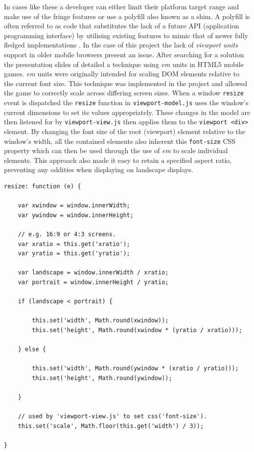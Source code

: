 \documentclass[final]{cmpreport}
\begin{document}
In cases like these a developer can either limit their platform target range and make use of the fringe features or use a polyfill also known as a shim. A polyfill is often referred to as code that substitutes the lack of a future API (application programming interface) by utilising existing features to mimic that of newer fully fledged implementations \cite{Lawson}. In the case of this project the lack of \textit{viewport units} support in older mobile browsers present an issue. After searching for a solution the presentation slides of \cite{Kadrmas} detailed a technique using \textit{em} units in HTML5 mobile games. \textit{em} units were originally intended for scaling DOM elements relative to the current font size. This technique was implemented in the project and allowed the game to correctly scale across differing screen sizes. When a window \texttt{resize} event is dispatched the \texttt{resize} function in \texttt{viewport-model.js} uses the window's current dimensions to set its values appropriately. These changes in the model are then listened for by \texttt{viewport-view.js} then applies them to the \texttt{viewport <div>} element. By changing the font size of the root (viewport) element relative to the window's width, all the contained elements also inherent this \texttt{font-size} CSS property which can then be used through the use of \textit{em} to scale individual elements. This approach also made it easy to retain a specified aspect ratio, preventing any oddities when displaying on landscape displays.

\clearpage
\begin{lstlisting}
resize: function (e) {

    var xwindow = window.innerWidth;
    var ywindow = window.innerHeight;

	// e.g. 16:9 or 4:3 screens.
    var xratio = this.get('xratio');
    var yratio = this.get('yratio');

    var landscape = window.innerWidth / xratio;
    var portrait = window.innerHeight / yratio;

    if (landscape < portrait) {

        this.set('width', Math.round(xwindow));
        this.set('height', Math.round(xwindow * (yratio / xratio)));

    } else {

        this.set('width', Math.round(ywindow * (xratio / yratio)));
        this.set('height', Math.round(ywindow));

    }

	// used by 'viewport-view.js' to set css('font-size').
    this.set('scale', Math.floor(this.get('width') / 3));

}
\end{lstlisting}
\end{document}
